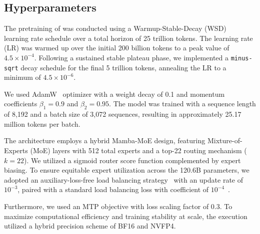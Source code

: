 \subsection{Hyperparameters}\label{sec:pre-train-hyperparams}

The pretraining of \ourbasemodel was conducted using a Warmup-Stable-Decay (WSD)~\citep{hu2024minicpm} learning rate schedule over a total horizon of 25 trillion tokens. The learning rate (LR) was warmed up over the initial 200 billion tokens to a peak value of $4.5\times10^{-4}$. Following a sustained stable plateau phase, we implemented a \texttt{minus-sqrt} decay schedule for the final 5 trillion tokens, annealing the LR to a minimum of $4.5\times10^{-6}$. 

We used AdamW~\citep{loshchilov2017decoupled} optimizer with a weight decay of 0.1 and momentum coefficients $\beta_1=0.9$ and $\beta_2=0.95$. The model was trained with a sequence length of 8,192 and a batch size of 3,072 sequences, resulting in approximately 25.17 million tokens per batch.



The architecture employs a hybrid Mamba-MoE design, featuring Mixture-of-Experts (MoE) layers with 512 total experts and a top-22 routing mechanism ($k=22$). We utilized a sigmoid router score function complemented by expert biasing. To ensure equitable expert utilization across the 120.6B parameters, we adopted an auxiliary-loss-free load balancing strategy~\citep{wang2024auxiliary, deepseekai2025deepseekv3technicalreport} with an update rate of $10^{-3}$, paired with a standard load balancing loss with coefficient of $10^{-4}$~\citep{lepikhin2020gshard}. 

Furthermore, we used an MTP objective with loss scaling factor of 0.3. To maximize computational efficiency and training stability at scale, the execution utilized a hybrid precision scheme of BF16 and NVFP4.





